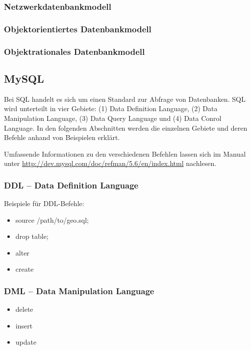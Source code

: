 \subsubsection{Netzwerkdatenbankmodell}
\subsubsection{Objektorientiertes Datenbankmodell}
\subsubsection{Objektrationales Datenbankmodell}


\subsection{MySQL}

Bei SQL handelt es sich um einen Standard zur Abfrage von Datenbanken. SQL wird unterteilt in vier Gebiete: (1) Data Definition Language, (2) Data Manipulation Language, (3) Data Query Language und (4) Data Conrol Language. In den folgenden Abschnitten werden die einzelnen Gebiete und deren Befehle anhand von Beispielen erklärt.

Umfassende Informationen zu den verschiedenen Befehlen lassen sich im Manual unter \url{http://dev.mysql.com/doc/refman/5.6/en/index.html} nachlesen.

\subsubsection{DDL -- Data Definition Language}
Beispiele für DDL-Befehle:

	\begin{itemize}
		\item source /path/to/geo.sql;
		\item drop table;
		\item alter
		\item create
	\end{itemize}

\subsubsection{DML -- Data Manipulation Language}
	
	\begin{itemize}
		\item delete 
		\item insert 
		\item update
	\end{itemize}
	

